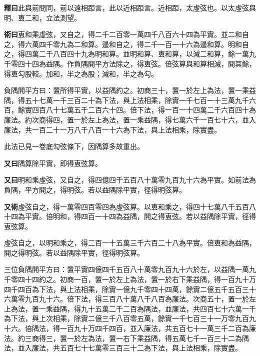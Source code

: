 \documentclass[12pt,a4paper]{article}
\begin{document}
\vspace{0.3em}

\noindent\textbf{釋曰}\quad 此與前問同，前以遠相距言，此以近相距言。近相距，太虛弦也。以太虛弦與明、叀二和，立法測望。

\vspace{0.3em}

\noindent\textbf{術曰}\quad 叀和乘虛弦，又自之，得二千二百零一萬四千八百六十四為平實。並二和自之，得六萬四千零九為二和算。邊和自之，得二千一百一十六為邊和算。明和自之，得四萬二千八百四十九為明和算。並明和算、叀和算，以減二和算，餘一萬九千零四十四為益隅。作負隅開平方法除之，得叀弦。倍弦算與和算相減，開其餘，得叀勾股較。加和，半之為股；減和，半之為勾。

\vspace{0.3em}

負隅開平方曰：置所得平實，以益隅約之。初商三十，置一於左上為法，置一乘益隅，得五十七萬一千三百二十為下法，與上法相乘，除實一千七百一十三萬九千六百，餘實四百八十七萬五千二百六十四。倍下法，得一百一十四萬二千六百四十為廉法。約次商得四，置一於左上為法，置一乘益隅，得七萬六千一百七十六，並入廉法，共一百二十一万八千八百一十六為下法，與上法相乘，除實盡。

\vspace{0.3em}

此法已見一卷底勾弦條下，因隅算多故重出。

\vspace{0.3em}

\noindent\textbf{又曰}\quad 隅算除平實，即得叀弦算。

\vspace{0.3em}

\noindent\textbf{又曰}\quad 明和乘虛弦，又自之，得四億四千五百八十萬零九百九十六為平實。如前法為負隅，平方開之，得明弦。若以益隅除平實，徑得明弦算。

\vspace{0.3em}

\noindent\textbf{又術}\quad 虛弦自之，得一萬零四百零四為虛弦算。以叀和乘之，得四十七萬八千五百八十四為平實。倍明和，得四百一十四為益隅，開之得叀弦。若以益隅除平實，徑得叀弦算。

\vspace{0.3em}

虛弦自之，以明和乘之，得二百一十五萬三千六百二十八為平實。倍叀和為益隅，開之得明弦。若以益隅除平實，徑得明弦算。

\vspace{0.3em}

三位負隅開平方曰：置平實四億四千五百八十萬零九百九十六於左，以益隅一萬九千零四十四約之。初商一百，置一於左上為法，置一於右下乘益隅，得一百九十万四千四百為下法，與上法相乘，除實一億九千零四十四萬，餘實二億五千五百三十六萬零九百九十六。倍下法，得三百八十萬八千八百為廉法。次商五十，置一於左上為法，置一乘益隅，得九十五萬二千二百為隅法，並廉法，共四百七十六萬一千為下法，與上次相乘，除實二億三千八百零五萬，餘實一千七百三十一万零九百九十六。倍隅法，得一百九十万四千四百，並入廉法，共五百七十一萬三千二百為廉法。約三商得三，置一於左為法，置一右下乘益隅，得五萬七千一百三十二為隅法，並入廉法，共五百七十七萬零三百三十二為下法，與上法相乘，除實盡。
\end{document}
